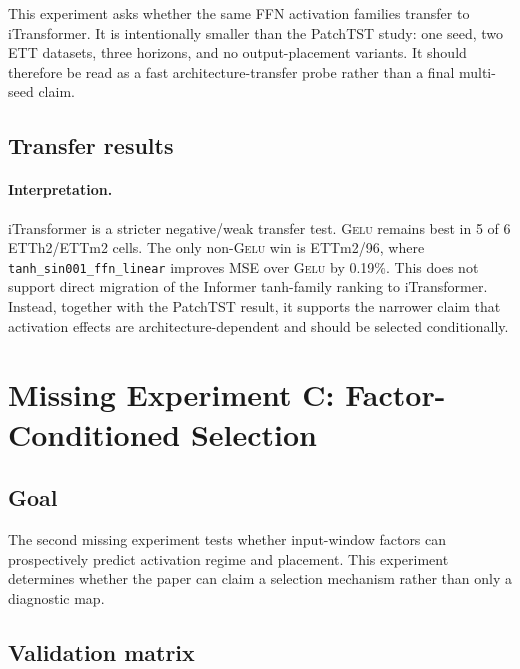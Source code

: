 \documentclass{article}
\newcommand{\gelu}{\textsc{Gelu}}
\newcommand{\patchtst}{PatchTST}
\newcommand{\itransformer}{iTransformer}
\begin{document}
This experiment asks whether the same FFN activation families transfer to \itransformer{}. It is intentionally smaller than the \patchtst{} study: one seed, two ETT datasets, three horizons, and no output-placement variants. It should therefore be read as a fast architecture-transfer probe rather than a final multi-seed claim.

\subsection{Transfer results}



\paragraph{Interpretation.}
\itransformer{} is a stricter negative/weak transfer test. \gelu{} remains best in 5 of 6 ETTh2/ETTm2 cells. The only non-\gelu{} win is ETTm2/96, where \texttt{tanh\_sin001\_ffn\_linear} improves MSE over \gelu{} by 0.19\%. This does not support direct migration of the Informer tanh-family ranking to \itransformer{}. Instead, together with the \patchtst{} result, it supports the narrower claim that activation effects are architecture-dependent and should be selected conditionally.

\section{Missing Experiment C: Factor-Conditioned Selection}

\subsection{Goal}

The second missing experiment tests whether input-window factors can prospectively predict activation regime and placement. This experiment determines whether the paper can claim a selection mechanism rather than only a diagnostic map.

\subsection{Validation matrix}
\end{document}
